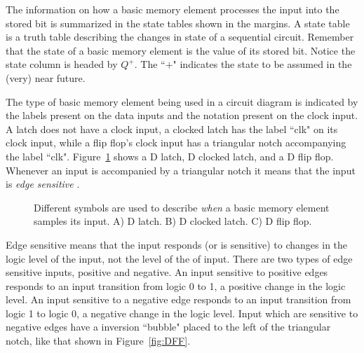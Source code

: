 The information on how a basic memory element processes the input into 
the stored bit is summarized in the state tables shown in the margins.
A state table is a truth table describing the changes in state 
of a sequential  circuit.  Remember that the state of a basic memory 
element is the value of its stored bit.  Notice the state column 
is headed by $Q^+$. The ``$+$" indicates the state to be assumed
in the (very) near future.

The type of basic memory element being used in a 
circuit diagram is indicated by the labels present on the data inputs and the 
notation present on the clock input.  A latch does not have a clock
input, a clocked latch has the label ``clk" on its clock input,
while a flip flop's clock input has a triangular notch accompanying 
the label ``clk".  Figure~\ref{fig:devices} shows a D latch, 
D clocked latch, and a D flip flop.  Whenever an input is accompanied
by a triangular notch it means that the input is {\it edge sensitive}
.  

\begin{figure}[ht]
\caption{Different symbols are used to describe {\it when} a basic
memory element samples its input.  A) D latch. B) D clocked latch.  
C) D flip flop.}
\label{fig:devices}
\end{figure}

Edge sensitive means that the input responds (or is sensitive)
to changes in the logic level of the input, not the level of the 
of input.  There are two types of edge sensitive inputs, positive
and negative.  An input sensitive to positive edges responds to an
input  transition from logic 0 to 1, a positive change in the logic 
level.  An input sensitive to a negative edge responds to an input
transition from logic 1 to logic 0, a negative change in the logic 
level.  Input which are sensitive to negative edges have a inversion
``bubble" placed to the left of the triangular notch, like that shown
in Figure~\ref{fig:DFF}.

